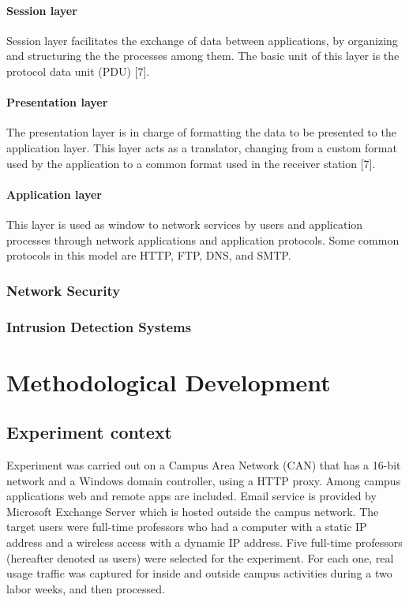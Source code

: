 \documentclass{article}
\begin{document}
\paragraph{Session layer} %
Session layer facilitates the exchange of data between applications, by organizing and structuring the the processes among them. The basic unit of this layer is the protocol data unit (PDU) [7].

\paragraph{Presentation layer} %
The presentation layer is in charge of formatting the data to be presented to the application layer. This layer acts as a translator, changing from a custom format used by the application to a common format used in the receiver station [7].

\paragraph{Application layer} %
This layer is used as window to network services by users and application processes through network applications and application protocols. Some common protocols in this model are HTTP, FTP, DNS, and SMTP.

\subsubsection{Network Security} %

\subsubsection{Intrusion Detection Systems} %

\section{Methodological Development} %

\subsection{Experiment context} %
Experiment was carried out on a Campus Area Network (CAN) that has a 16-bit network and a Windows domain controller, using a HTTP proxy. Among campus applications web and remote apps are included.
Email service is provided by Microsoft Exchange Server which is hosted outside the campus network.
The target users were full-time professors who had a computer with a static IP address and a wireless access with a dynamic IP address.
Five full-time professors (hereafter denoted as users) were selected for the experiment. For each one, real usage traffic was captured for inside and outside campus activities during a two labor weeks, and then processed.
\end{document}
